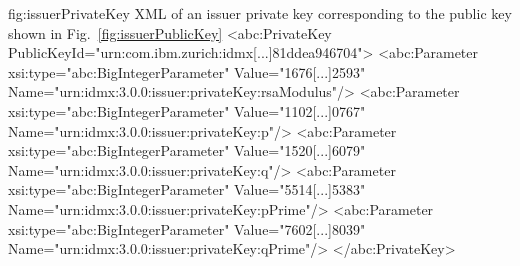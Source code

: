 \begin{xml}
{fig:issuerPrivateKey}
{XML of an issuer private key corresponding to the public key shown in 
Fig.~\ref{fig:issuerPublicKey}}
<abc:PrivateKey PublicKeyId="urn:com.ibm.zurich:idmx[...]81ddea946704">
  <abc:Parameter xsi:type="abc:BigIntegerParameter" Value="1676[...]2593" 
    Name="urn:idmx:3.0.0:issuer:privateKey:rsaModulus"/>
  <abc:Parameter xsi:type="abc:BigIntegerParameter" Value="1102[...]0767" 
    Name="urn:idmx:3.0.0:issuer:privateKey:p"/>
  <abc:Parameter xsi:type="abc:BigIntegerParameter" Value="1520[...]6079" 
    Name="urn:idmx:3.0.0:issuer:privateKey:q"/>
  <abc:Parameter xsi:type="abc:BigIntegerParameter" Value="5514[...]5383" 
    Name="urn:idmx:3.0.0:issuer:privateKey:pPrime"/>
  <abc:Parameter xsi:type="abc:BigIntegerParameter" Value="7602[...]8039" 
    Name="urn:idmx:3.0.0:issuer:privateKey:qPrime"/>
</abc:PrivateKey>
\end{xml}  








